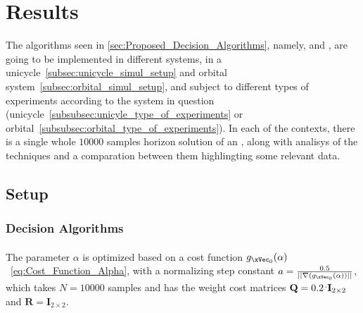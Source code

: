 
%


\chapter{Results}
\label{cha:results}

The algorithms seen in \ref{sec:Proposed_Decision_Algorithms}, namely, \label{subsec:decision_algorithms}  and ,  are going to be implemented in different systems, in a unicycle~\ref{subsec:unicycle_simul_setup} and orbital system~\ref{subsec:orbital_simul_setup}, and subject to different types of experiments according to the system in question (unicycle~\ref{subsubsec:unicyle_type_of_experiments} or orbital~\ref{subsubsec:orbital_type_of_experiments}). In each of the contexts, there is a single whole \(10000\) samples horizon solution of an , along with analisys of the techniques and a comparation between them highlingting some relevant data.

\section{Setup}
\label{sec:setup}

\subsection{Decision Algorithms}
\label{subsec:decision_algorithms}

\subsubsection{}
\label{subsubsec:A-JO_parameters}

The parameter \(\alpha\) is optimized based on a cost function \(g_{\xVec_0}(\alpha)\)~\ref{eq:Cost_Function_Alpha}, with a normalizing step constant \(a = \frac{0.5}{||\nabla(g_{\xVec_0}(\alpha))||}\), which takes \(N=10000\) samples and has the weight cost matrices \(\mathbf{Q} = 0.2\hspace{0.1em}^.\mathbf{I}_{2\times 2} \) and \(\mathbf{R} = \mathbf{I}_{2\times 2} \).\\

